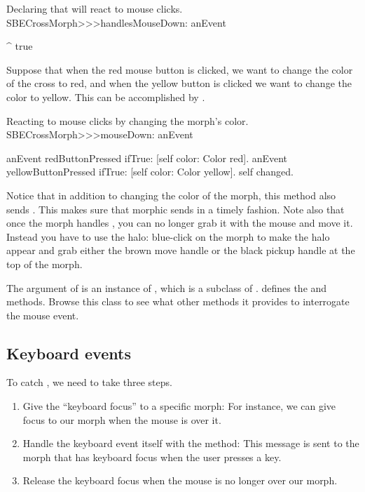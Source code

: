 \documentclass[a4paper,10pt,twoside]{book}
\begin{document}
\begin{method}{Declaring that  will react to mouse clicks.}
SBECrossMorph>>>handlesMouseDown: anEvent

	^ true
\end{method}

Suppose that when the red mouse button is clicked, we want to change the color of the cross to red, and when the yellow button is clicked we want to change the color to yellow.
This can be accomplished by .

\begin{method}[mouseDown]{Reacting to mouse clicks by changing the morph's color.}
SBECrossMorph>>>mouseDown: anEvent

	anEvent redButtonPressed
		ifTrue: [self color: Color red].
	anEvent yellowButtonPressed
		ifTrue: [self color: Color yellow].
	self changed.
\end{method}

Notice that in addition to changing the color of the morph, this method also sends .
This makes sure that morphic sends  in a timely fashion.
Note also that once the morph handles , you can no longer grab it with the mouse and move it.
Instead you have to use the halo: blue-click on the morph to make the halo appear and grab either the brown move handle \moveHandle{} or the black pickup handle \grabHandle{} at the top of the morph.

The  argument of  is an instance of \mbox{,} which is a subclass of .
 defines the  and  methods.
Browse this class to see what other methods it provides to interrogate the mouse event.

\subsection{Keyboard events}

To catch , we need to take three steps.
\begin{enumerate}
	\item Give the ``keyboard focus'' to a specific morph:
	For instance, we can give focus to our morph when the mouse is over it.
	\item Handle the keyboard event itself with the  method:
	This message is sent to the morph that has keyboard focus when the user presses a key.
	\item Release the keyboard focus when the mouse is no longer over our morph.
\end{enumerate}
\end{document}

